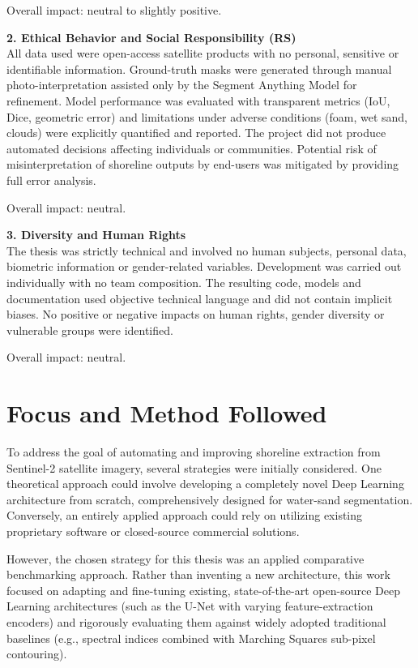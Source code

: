 ﻿\documentclass[ENG]{TFUOC}%
\begin{document}
Overall impact: neutral to slightly positive.

\textbf{2. Ethical Behavior and Social Responsibility (RS)} \\
All data used were open-access satellite products with no personal, sensitive or identifiable information. Ground-truth masks were generated through manual photo-interpretation assisted only by the Segment Anything Model for refinement. Model performance was evaluated with transparent metrics (IoU, Dice, geometric error) and limitations under adverse conditions (foam, wet sand, clouds) were explicitly quantified and reported. The project did not produce automated decisions affecting individuals or communities. Potential risk of misinterpretation of shoreline outputs by end-users was mitigated by providing full error analysis.

Overall impact: neutral.

\textbf{3. Diversity and Human Rights} \\
The thesis was strictly technical and involved no human subjects, personal data, biometric information or gender-related variables. Development was carried out individually with no team composition. The resulting code, models and documentation used objective technical language and did not contain implicit biases. No positive or negative impacts on human rights, gender diversity or vulnerable groups were identified.

Overall impact: neutral.

\section{Focus and Method Followed}

To address the goal of automating and improving shoreline extraction from Sentinel-2 satellite imagery, several strategies were initially considered. One theoretical approach could involve developing a completely novel Deep Learning architecture from scratch, comprehensively designed for water-sand segmentation. Conversely, an entirely applied approach could rely on utilizing existing proprietary software or closed-source commercial solutions.

However, the chosen strategy for this thesis was an applied comparative benchmarking approach. Rather than inventing a new architecture, this work focused on adapting and fine-tuning existing, state-of-the-art open-source Deep Learning architectures (such as the U-Net with varying feature-extraction encoders) and rigorously evaluating them against widely adopted traditional baselines (e.g., spectral indices combined with Marching Squares sub-pixel contouring). 
\end{document}
